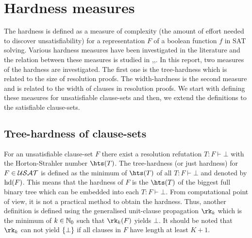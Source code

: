 \documentclass[]{book}
\begin{document}
\chapter{Hardness measures}
\label{cha:Hardness Measures}

The hardness is defined as a measure of complexity (the amount of effort needed to discover unsatisfiability) for a representation $F$ of a boolean function $f$ in SAT solving. Various hardness measures have been investigated in the literature and the relation between these measures is studied in \cite{h5},\cite{h18},\cite{h8}. In this report, two measures of the hardness are investigated. The first one is the tree-hardness which is related to the size of resolution proofs. The width-hardness is the second measure and is related to the width of clauses in resolution proofs. We start with defining these measures for unsatisfiable clause-sets and then, we extend the definitions to the satisfiable clause-sets. 

\section{Tree-hardness of clause-sets}
\label{sec:Hardnessunsat}

For an unsatisfiable clause-set $F$ there exist a resolution refutation $T:F \vdash \bot$ with the Horton-Strahler number $\hts(T)$. The tree-hardness (or just hardness) for $F \in \mathcal{USAT}$ is defined as the minimum of $\hts(T)$ of all  $T:F \vdash \bot$ and denoted by $\operatorname{hd}(F)$. This means that the hardness of $F$ is the $\hts(T)$ of the biggest full binary tree which can be embedded into each $T : F \vdash \bot$. From computational point of view, it is not a practical method to obtain the hardness. Thus, another definition is defined using the generalised unit-clause propagation $\rk_k$ which is the minimum of $k \in \mathbb{N}_0$ such that $\rk_k(F)$ yields $\bot$. It should be noted that $\rk_k$ can not yield $\{ \bot \}$ if all clauses in $F$ have length at least $K+1$.
\end{document}
